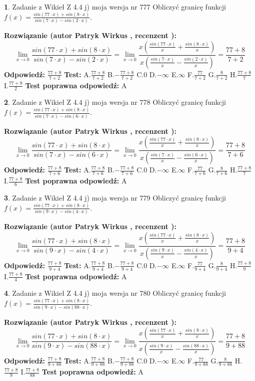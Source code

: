 \documentclass[12pt, a4paper]{article}
\theoremstyle{definition} %
\newtheorem{zad}{}
\newcommand{\zadStart}[1]{\begin{zad}#1\newline}
\newcommand{\zadStop}{\end{zad}}
\newcommand{\rozwStart}[2]{\noindent \textbf{Rozwiązanie (autor #1 , recenzent #2): }\newline}
\newcommand{\rozwStop}{\newline}
\newcommand{\odpStart}{\noindent \textbf{Odpowiedź:}\newline}
\newcommand{\odpStop}{\newline}
\newcommand{\testStart}{\noindent \textbf{Test:}\newline}
\newcommand{\testStop}{\newline}
\newcommand{\kluczStart}{\noindent \textbf{Test poprawna odpowiedź:}\newline}
\newcommand{\kluczStop}{\newline}
\begin{document}
\zadStart{Zadanie z Wikieł Z 4.4 j) moja wersja nr 777}
Obliczyć granicę funkcji $f(x)=\frac{sin(77\cdot x) +sin(8\cdot x)}{sin(7\cdot x) -sin(2\cdot x)}$.
\zadStop
\rozwStart{Patryk Wirkus}{}
$$\lim\limits_{x\to 0}\frac{sin(77\cdot x) +sin(8\cdot x)}{sin(7\cdot x) -sin(2\cdot x)}=\lim\limits_{x\to 0}\frac{x(\frac{sin(77\cdot x)}{x}+\frac{sin(8\cdot x)}{x})}{x(\frac{sin(7\cdot x)}{x}-\frac{sin(2\cdot x)}{x})}=\frac{77+8}{7+2}$$
\rozwStop
\odpStart
$\frac{77+8}{7+2}$
\odpStop
\testStart
A.$\frac{77+8}{7+2}$
B.$-\frac{77+8}{7+2}$
C.$0$
D.$-\infty$
E.$\infty$
F.$\frac{77}{7+2}$
G.$\frac{8}{7+2}$
H.$\frac{77+8}{7}$
I.$\frac{77+8}{2}$
\testStop
\kluczStart
A
\kluczStop



\zadStart{Zadanie z Wikieł Z 4.4 j) moja wersja nr 778}
Obliczyć granicę funkcji $f(x)=\frac{sin(77\cdot x) +sin(8\cdot x)}{sin(7\cdot x) -sin(6\cdot x)}$.
\zadStop
\rozwStart{Patryk Wirkus}{}
$$\lim\limits_{x\to 0}\frac{sin(77\cdot x) +sin(8\cdot x)}{sin(7\cdot x) -sin(6\cdot x)}=\lim\limits_{x\to 0}\frac{x(\frac{sin(77\cdot x)}{x}+\frac{sin(8\cdot x)}{x})}{x(\frac{sin(7\cdot x)}{x}-\frac{sin(6\cdot x)}{x})}=\frac{77+8}{7+6}$$
\rozwStop
\odpStart
$\frac{77+8}{7+6}$
\odpStop
\testStart
A.$\frac{77+8}{7+6}$
B.$-\frac{77+8}{7+6}$
C.$0$
D.$-\infty$
E.$\infty$
F.$\frac{77}{7+6}$
G.$\frac{8}{7+6}$
H.$\frac{77+8}{7}$
I.$\frac{77+8}{6}$
\testStop
\kluczStart
A
\kluczStop



\zadStart{Zadanie z Wikieł Z 4.4 j) moja wersja nr 779}
Obliczyć granicę funkcji $f(x)=\frac{sin(77\cdot x) +sin(8\cdot x)}{sin(9\cdot x) -sin(4\cdot x)}$.
\zadStop
\rozwStart{Patryk Wirkus}{}
$$\lim\limits_{x\to 0}\frac{sin(77\cdot x) +sin(8\cdot x)}{sin(9\cdot x) -sin(4\cdot x)}=\lim\limits_{x\to 0}\frac{x(\frac{sin(77\cdot x)}{x}+\frac{sin(8\cdot x)}{x})}{x(\frac{sin(9\cdot x)}{x}-\frac{sin(4\cdot x)}{x})}=\frac{77+8}{9+4}$$
\rozwStop
\odpStart
$\frac{77+8}{9+4}$
\odpStop
\testStart
A.$\frac{77+8}{9+4}$
B.$-\frac{77+8}{9+4}$
C.$0$
D.$-\infty$
E.$\infty$
F.$\frac{77}{9+4}$
G.$\frac{8}{9+4}$
H.$\frac{77+8}{9}$
I.$\frac{77+8}{4}$
\testStop
\kluczStart
A
\kluczStop



\zadStart{Zadanie z Wikieł Z 4.4 j) moja wersja nr 780}
Obliczyć granicę funkcji $f(x)=\frac{sin(77\cdot x) +sin(8\cdot x)}{sin(9\cdot x) -sin(88\cdot x)}$.
\zadStop
\rozwStart{Patryk Wirkus}{}
$$\lim\limits_{x\to 0}\frac{sin(77\cdot x) +sin(8\cdot x)}{sin(9\cdot x) -sin(88\cdot x)}=\lim\limits_{x\to 0}\frac{x(\frac{sin(77\cdot x)}{x}+\frac{sin(8\cdot x)}{x})}{x(\frac{sin(9\cdot x)}{x}-\frac{sin(88\cdot x)}{x})}=\frac{77+8}{9+88}$$
\rozwStop
\odpStart
$\frac{77+8}{9+88}$
\odpStop
\testStart
A.$\frac{77+8}{9+88}$
B.$-\frac{77+8}{9+88}$
C.$0$
D.$-\infty$
E.$\infty$
F.$\frac{77}{9+88}$
G.$\frac{8}{9+88}$
H.$\frac{77+8}{9}$
I.$\frac{77+8}{88}$
\testStop
\kluczStart
A
\kluczStop
\end{document}

